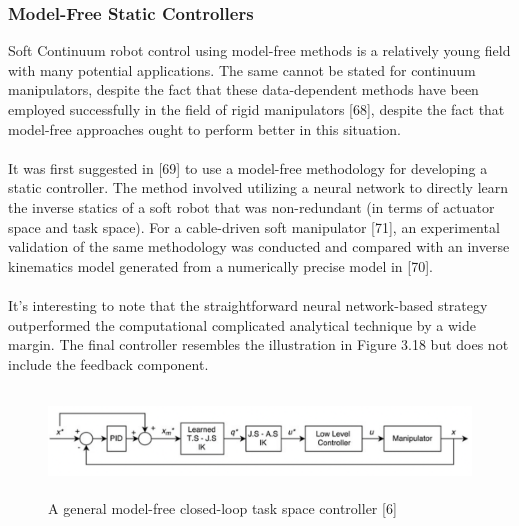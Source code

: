 \documentclass[12pt,twoside,a4]{mwbk}
\begin{document}
\subsubsection{Model-Free Static Controllers}
Soft Continuum robot control using model-free methods is a relatively young field with many potential applications. The same cannot be stated for continuum manipulators, despite the fact that these data-dependent methods have been employed successfully in the field of rigid manipulators [68], despite the fact that model-free approaches ought to perform better in this situation.
\\ \\
It was first suggested in [69] to use a model-free methodology for developing a static controller. The method involved utilizing a neural network to directly learn the inverse statics of a soft robot that was non-redundant (in terms of actuator space and task space). For a cable-driven soft manipulator [71], an experimental validation of the same methodology was conducted and compared with an inverse kinematics model generated from a numerically precise model in [70]. 
\\ \\
It's interesting to note that the straightforward neural network-based strategy outperformed the computational complicated analytical technique by a wide margin. The final controller resembles the illustration in Figure 3.18 but does not include the feedback component. 
\begin{figure}[h]
    \centering
    \includegraphics[width=15.3cm, height=2.8cm]{cont5.png}
    \caption{A general model-free closed-loop task space controller [6]}
\end{figure}
\end{document}
